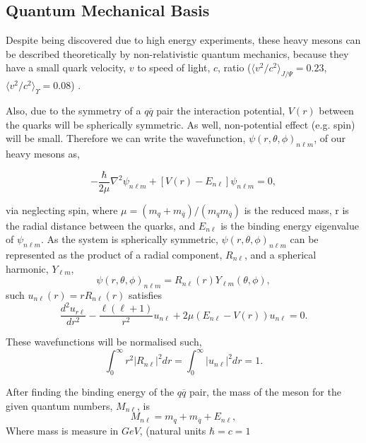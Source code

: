 \documentclass[10pt,twocolumn]{revtex4}    %
\begin{document}
 \subsection{Quantum Mechanical Basis}\label{ssec:QMBasis}
Despite being discovered due to high energy experiments, these heavy mesons can be described theoretically by non-relativistic quantum mechanics, because they have a small quark velocity, $v$ to speed of light, $c$, ratio ($\langle v^2/c^2\rangle _{J/\Psi} = 0.23$, $\langle v^2/c^2\rangle _{\Upsilon} = 0.08$) \textbf{\cite{PotentialModels}}.

Also, due to the symmetry of a $q\overline{q}$ pair the interaction potential, $V(r)$ between the quarks will be spherically symmetric. As well, non-potential effect (e.g. spin) will be small\textbf{\cite{PotentialModels}}. Therefore we can write the wavefunction, $\psi(r,\theta,\phi)_{n\ell m}$, of our heavy mesons as,

\begin{equation} \label{eqn:SpinlessWfn}
-\frac{\hbar}{2\mu}\nabla^2\psi_{n\ell m} + [V(r)-E_{n\ell}]\psi_{n\ell m} = 0, 
\end{equation}

via neglecting spin, where $\mu = (m_q+m_{\overline{q}})/(m_qm_{\overline{q}})$ is the reduced mass, r is the radial distance between the quarks, and $E_{n\ell}$ is the binding energy eigenvalue of $\psi_{n\ell m}$. 
As the system is spherically symmetric, $\psi(r,\theta,\phi)_{n\ell m}$ can be represented as the product of a radial component, $R_{n\ell}$, and a spherical harmonic, $Y_{\ell m}$,
\begin{equation}\label{eqn:splitWavefunction}
    \psi(r,\theta,\phi)_{n\ell m} = R_{n\ell}(r)Y_{\ell m}(\theta,\phi),
\end{equation}
such $u_{n \ell}(r) = rR_{n\ell}(r)$ satisfies
\begin{equation}\label{eqn:secondOrderODE}
    \frac{d^2 u_{r \ell}}{dr^2} - \frac{\ell(\ell + 1)}{r^2}u_{n \ell} + 2\mu(E_{n \ell} - V(r))u_{n \ell} = 0.
\end{equation}

These wavefunctions will be normalised such,
\begin{equation}\label{Normalisation}
    \int_{0}^{\infty} r^2|R_{n \ell}|^2 dr =  \int_{0}^{\infty} |u_{n \ell}|^2 dr = 1.
\end{equation}

After finding the binding energy of the $q\overline{q}$ pair, the mass of the meson for the given quantum numbers, $M_{n \ell}$, is
\begin{equation}\label{eqn:mesonMass}
    M_{n\ell} = m_q + m_{\overline{q}} + E_{n \ell},
\end{equation}
Where mass is measure in $GeV$, (natural units $\hbar=c=1$
\end{document}
